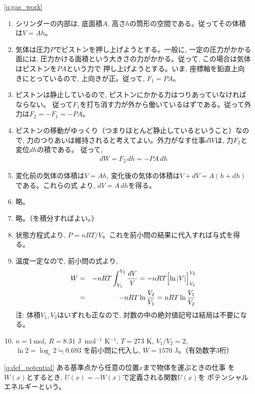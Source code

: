 % 
\ref{q:gas_work}　
\begin{enumerate}
\item シリンダーの内部は, 底面積$A$, 高さ$h$の筒形の空間である。従ってその体積は$V=Ah$。
\item 気体は圧力$P$でピストンを押し上げようとする。一般に, 一定の圧力がかかる面には, 
圧力かける面積という大きさの力がかかる。従って, この場合は気体はピストンを$PA$という力で
押し上げようとする。いま, 座標軸を鉛直上向きにとっているので, 上向きが正。従って, $F_1=PA$。
\item ピストンは静止しているので, ピストンにかかる力はつりあっていなければならない。
従って$F_1$を打ち消す力が外から働いているはずである。従って外力は$F_2=-F_1=-PA$。
\item ピストンの移動がゆっくり（つまりほとんど静止しているということ）なので, 
力のつりあいは維持されると考えてよい。外力がなす仕事$dW$は, 力$F_2$と変位$dh$の積である。
従って, 
\begin{eqnarray}dW=F_2\,dh=-PA\,dh\end{eqnarray}
\item 変化前の気体の体積は$V=Ah$, 変化後の気体の体積は$V+dV=A(h+dh)$である。これらの式
より, $dV=A\,dh$を得る。
\item 略。
\item 略。（を積分すればよい。）
\item 状態方程式より, $P=nRT/V$。これを前小問の結果に代入すれば与式を得る。
\item 温度一定なので, 前小問の式より, 
\begin{eqnarray}
W&=&-nRT\int_{V_1}^{V_2}\frac{dV}{V}=-nRT\Bigl[\ln|V|\Bigr]_{V_1}^{V_2}\nonumber\\
&=&-nRT\ln \frac{V_2}{V_1}=nRT\ln \frac{V_1}{V_2}
\end{eqnarray}
注: 体積$V_1, V_2$はいずれも正なので, 対数の中の絶対値記号は結局は不要になる。
\item $n=1\,$mol, $R=8.31$ J~mol$^{-1}$ K$^{-1}$, $T=273$ K, $V_1/V_2=2$, $\ln 2=\log_e 2\fallingdotseq0.693$
を前小問に代入し, $W=1570$ J。（有効数字3桁）
\end{enumerate}
\vspace{0.2cm}

% 
\ref{q:def_potential}
ある基準点から任意の位置$x$まで物体を運ぶときの仕事
を$W(x)$とするとき, $U(x)=-W(x)$で定義される関数$U(x)$を
ポテンシャルエネルギーという。
\vspace{0.2cm}

